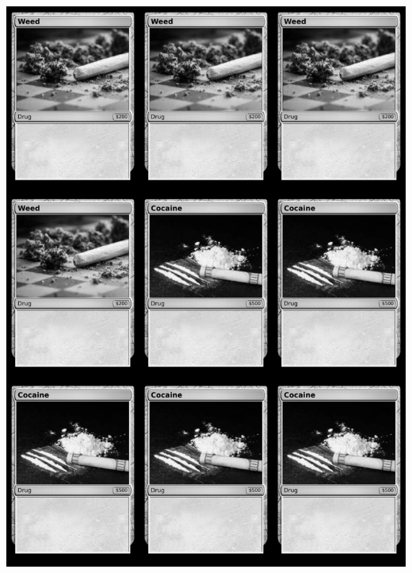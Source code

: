 \documentclass[a4paper]{article}
\begin{document}
\begin{center}
	\centering
	\includegraphics[width=190.5mm,height=266.7mm]{output/temp/page2.png}
\end{center}

\newpage
\end{document}
